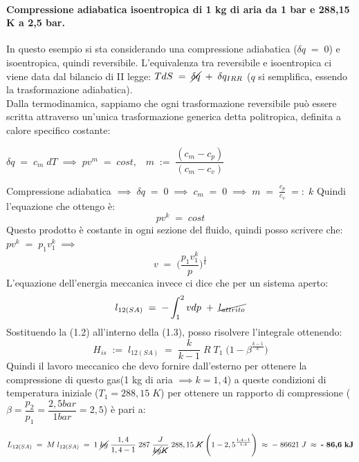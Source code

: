 \documentclass[a4paper, twoside, 12pt]{report}
\begin{document}
\paragraph{Compressione adiabatica isoentropica di 1 kg di aria da 1 bar e 288,15 K a 2,5 bar.\\}
In questo esempio si sta considerando una compressione adiabatica ($\delta q\;=\;0$) e isoentropica, quindi reversibile. L'equivalenza tra reversibile e isoentropica ci viene data dal bilancio di II legge: $TdS\;=\;\cancel{\delta q}\;+\;\delta q_{IRR}$ ($q$ si semplifica, essendo la trasformazione adiabatica). \\
Dalla termodinamica, sappiamo che ogni trasformazione reversibile può essere scritta attraverso un'unica trasformazione generica detta politropica, definita a calore specifico costante:
\begin{center}
	$\delta q\;=\;c_{m}\;dT\;\implies\;pv^m\;=\;cost,\;\;\;m\;:=\; \dfrac{(c_{m}-c_{p})}{(	c_{m}-c_{v})}$
\end{center}
Compressione adiabatica $\implies\;\delta q\;=\;0\;\implies\;c_{m}\;=\;0\;\implies\;m\;=\;\frac{c_{p}}{c_{v}}\;=:\;k$
Quindi l'equazione che ottengo è: 
\begin{equation}
	pv^k\;=\;cost
\end{equation}
Questo prodotto è costante in ogni sezione del fluido, quindi posso scrivere che: $	pv^k\;=\;p_{1}v^k_{1}\;\implies$
\begin{equation}
	v\;=\;\Biggl(\dfrac{p_{1}v_{1}^{k}}{p}\Biggr)^\frac{1}{k}
\end{equation}
L'equazione dell'energia meccanica invece ci dice che per un sistema aperto:
\begin{equation}
	l_{12(SA)}\;=\;-\int_{1}^{2}vdp\;+\;\cancel{l_{attrito}}
\end{equation}
Sostituendo la (1.2) all'interno della (1.3), posso risolvere l'integrale ottenendo:
\begin{equation}
	H_{is}\;:=\;l_{12(SA)}\;=\;\dfrac{k}{k-1}\;R\;T_{1}\;\Biggl(1-\beta^\frac{k-1}{k}\Biggr)
\end{equation}
Quindi il lavoro meccanico che devo fornire dall'esterno per ottenere la compressione di questo gas(1 kg di aria $\implies k=1,4$) a queste condizioni di temperatura iniziale ($T_{1} = 288,15\; K$) per ottenere un rapporto di compressione ($\beta = \dfrac{p_{2}}{p_{1}} = \dfrac{2,5 bar}{1 bar} = 2,5$) è pari a:
\begin{center}
	$L_{12(SA)}\;=\;M\;l_{12(SA)}\;=\;1\;\cancel{kg}\;\dfrac{1,4}{1,4-1}\;287\;\dfrac{J}{\cancel{kg}\cancel{K}}\;288,15\;\cancel{K}\;\Biggl(1-2,5^\frac{1,4-1}{1,4}\Biggr)\;\approx\;-\;86621\;J\;\approx\;\textbf{-\;86,6\;kJ}$
\end{center}
\end{document}
